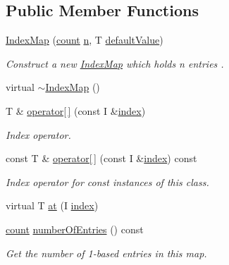 \subsection*{Public Member Functions}
\begin{DoxyCompactItemize}
\item 
\hyperlink{class_networ_kit_1_1_index_map_ad1b191ff4d5c97c221c8be6f10e517f8}{Index\-Map} (\hyperlink{namespace_networ_kit_a76b399edfa50ae72e4aa86007aaa800a}{count} \hyperlink{class_networ_kit_1_1_index_map_abffdb945755f2789f33b5eb6e95430d8}{n}, T \hyperlink{class_networ_kit_1_1_index_map_aa7b9e890a78e37f9e1fd1978b3706c4c}{default\-Value})
\begin{DoxyCompactList}\small\item\em Construct a new \hyperlink{class_networ_kit_1_1_index_map}{Index\-Map} which holds n entries . \end{DoxyCompactList}\item 
virtual \hyperlink{class_networ_kit_1_1_index_map_a8708a9f45cbd25368b18ad62eda39d50}{$\sim$\-Index\-Map} ()
\item 
T \& \hyperlink{class_networ_kit_1_1_index_map_aa8486b4e644ee023322b8e5de624012c}{operator\mbox{[}$\,$\mbox{]}} (const I \&\hyperlink{namespace_networ_kit_a486772e5516be73694ef0d780b828d04}{index})
\begin{DoxyCompactList}\small\item\em Index operator. \end{DoxyCompactList}\item 
const T \& \hyperlink{class_networ_kit_1_1_index_map_a96cdbc04080f3acfed51b12267c31732}{operator\mbox{[}$\,$\mbox{]}} (const I \&\hyperlink{namespace_networ_kit_a486772e5516be73694ef0d780b828d04}{index}) const 
\begin{DoxyCompactList}\small\item\em Index operator for const instances of this class. \end{DoxyCompactList}\item 
virtual T \hyperlink{class_networ_kit_1_1_index_map_adf2c9ecee594a7ef579a42019619b39e}{at} (I \hyperlink{namespace_networ_kit_a486772e5516be73694ef0d780b828d04}{index})
\item 
\hyperlink{namespace_networ_kit_a76b399edfa50ae72e4aa86007aaa800a}{count} \hyperlink{class_networ_kit_1_1_index_map_a6fb59b20d7464a8355c0995221a414dc}{number\-Of\-Entries} () const 
\begin{DoxyCompactList}\small\item\em Get the number of 1-\/based entries in this map. \end{DoxyCompactList}\item 

\end{DoxyCompactItemize}
